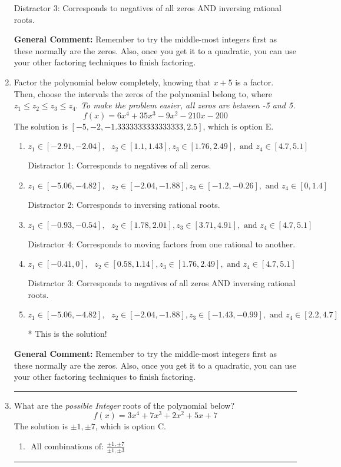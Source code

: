 \documentclass{extbook}[14pt]
\newcommand{\litem}[1]{\item #1

\rule{\textwidth}{0.4pt}}
\begin{document}
\begin{enumerate}
{\begin{enumerate}[label=\Alph*.]
 Distractor 3: Corresponds to negatives of all zeros AND inversing rational roots.
\end{enumerate}

\textbf{General Comment:} Remember to try the middle-most integers first as these normally are the zeros. Also, once you get it to a quadratic, you can use your other factoring techniques to finish factoring.
}
\litem{
Factor the polynomial below completely, knowing that $x+5$ is a factor. Then, choose the intervals the zeros of the polynomial belong to, where $z_1 \leq z_2 \leq z_3 \leq z_4$. \textit{To make the problem easier, all zeros are between -5 and 5.}
\[ f(x) = 6x^{4} +35 x^{3} -9 x^{2} -210 x -200 \]The solution is \( [-5, -2, -1.3333333333333333, 2.5] \), which is option E.\begin{enumerate}[label=\Alph*.]
\item \( z_1 \in [-2.91, -2.04], \text{   }  z_2 \in [1.1, 1.43], z_3 \in [1.76, 2.49], \text{   and   } z_4 \in [4.7, 5.1] \)

 Distractor 1: Corresponds to negatives of all zeros.
\item \( z_1 \in [-5.06, -4.82], \text{   }  z_2 \in [-2.04, -1.88], z_3 \in [-1.2, -0.26], \text{   and   } z_4 \in [0, 1.4] \)

 Distractor 2: Corresponds to inversing rational roots.
\item \( z_1 \in [-0.93, -0.54], \text{   }  z_2 \in [1.78, 2.01], z_3 \in [3.71, 4.91], \text{   and   } z_4 \in [4.7, 5.1] \)

 Distractor 4: Corresponds to moving factors from one rational to another.
\item \( z_1 \in [-0.41, 0], \text{   }  z_2 \in [0.58, 1.14], z_3 \in [1.76, 2.49], \text{   and   } z_4 \in [4.7, 5.1] \)

 Distractor 3: Corresponds to negatives of all zeros AND inversing rational roots.
\item \( z_1 \in [-5.06, -4.82], \text{   }  z_2 \in [-2.04, -1.88], z_3 \in [-1.43, -0.99], \text{   and   } z_4 \in [2.2, 4.7] \)

* This is the solution!
\end{enumerate}

\textbf{General Comment:} Remember to try the middle-most integers first as these normally are the zeros. Also, once you get it to a quadratic, you can use your other factoring techniques to finish factoring.
}
\litem{
What are the \textit{possible Integer} roots of the polynomial below?
\[ f(x) = 3x^{4} +7 x^{3} +2 x^{2} +5 x + 7 \]The solution is \( \pm 1,\pm 7 \), which is option C.\begin{enumerate}[label=\Alph*.]
\item \( \text{ All combinations of: }\frac{\pm 1,\pm 7}{\pm 1,\pm 3} \)


\end{enumerate}}
\end{enumerate}
\end{document}
